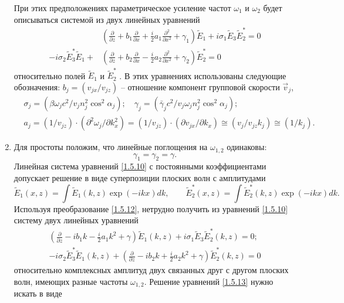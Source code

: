 \documentclass[a4paper]{article}
\begin{document}
\begin{enumerate}
	 При этих предположениях параметрическое усиление частот $\omega_{1}$  и $\omega_{2}$   будет описываться системой из двух линейных уравнений 
	 \begin{equation}
	 	\begin{split}
	 		&\left(\frac{\partial}{\partial z}+b_{1}\frac{\partial}{\partial x}+\frac{i}{2}a_{1}\frac{\partial^{2}}{\partial x^{2}}+\gamma_{1}\right)\tilde{E}_{1}+i\sigma_{1}\tilde{E}_{3}\tilde{E}_{2}^{*}=0\\
	 		-i\sigma_{2}\tilde{E}_{3}^{*}\tilde{E}_{1}+&\left(\frac{\partial}{\partial z}+b_{2}\frac{\partial}{\partial x}-\frac{i}{2}a_{2}\frac{\partial^{2}}{\partial x^{2}}+\gamma_{2}\right)\tilde{E}_{2}^{*}=0
	 	\end{split}
	 	\label{1.5.10}
	 \end{equation}
 	относительно полей $\tilde{E}_{1}$  и $\tilde{E}_{2}^{*}$ . В этих уравнениях использованы следующие обозначения: $b_{j}=\left(v_{jx}/v_{jz}\right)$  -- отношение компонент групповой скорости $\vec{v}_{j}$, 
 	\begin{equation}
 		\begin{split}
 			&\sigma_{j}=\left(\beta\omega_{j}c^{2}/v_{j}n_{j}^{2}\cos^{2}\alpha_{j}\right);\quad\gamma_{j}=\left(\bar{\gamma}_{j}c^{2}/v_{j}\omega_{j}n_{j}^{2}\cos^{2}\alpha_{j}\right);\\
 			&a_{j}=\left(1/v_{jz}\right)\cdot\left(\partial^{2}\omega_{j}/\partial k_{x}^{2}\right)=\left(1/v_{jz}\right)\cdot\left(\partial v_{jx}/\partial k_{x}\right)\cong\left(v_{j}/v_{jz}k_{j}\right)\cong\left(1/k_{j}\right).
 		\end{split}
 		\tag{10'}\label{1.5.10'}
 	\end{equation}
 	\item Для простоты положим, что линейные поглощения на $\omega_{1,2}$ одинаковы: 
 	\begin{equation}
 		\gamma_{1}=\gamma_{2}=\gamma.
 		\label{1.5.11}
 	\end{equation}
 	Линейная система уравнений \eqref{1.5.10} с постоянными коэффициентами допускает решение в виде суперпозиции плоских волн с амплитудами 
 	\begin{equation}
 		\tilde{E}_{1}(x,z)=\int\tilde{E}_{1}(k,z)\exp(-ikx)dk,\qquad\tilde{E}_{2}^{*}(x,z)=\int\tilde{E}_{2}^{*}(k,z)\exp(-ikx)dk.
 		\label{1.5.12}
 	\end{equation}
 	Используя преобразование \eqref{1.5.12}, нетрудно получить из уравнений \eqref{1.5.10} систему двух линейных уравнений 
 	\begin{equation}
	\begin{split}
		\left(\frac{\partial}{\partial z}-ib_{1}k-\frac{i}{2}a_{1}k^{2}+\gamma\right)\tilde{E}_{1}(k,z)+i\sigma_{1}\tilde{E}_{3}\tilde{E}_{2}^{*}(k,z)=0;\\
			-i\sigma_{2}\tilde{E}_{3}^{*}\tilde{E}_{1}(k,z)+\left(\frac{\partial}{\partial z}-ib_{2}k+\frac{i}{2}a_{2}k^{2}+\gamma\right)\tilde{E}_{2}^{*}(k,z)=0
	\end{split}
	\label{1.5.13}
	\end{equation}
	относительно комплексных амплитуд двух связанных друг с другом плоских волн, имеющих разные частоты $\omega_{1,2}$. Решение уравнений \eqref{1.5.13} нужно искать в виде 	


\end{enumerate}
\end{document}
